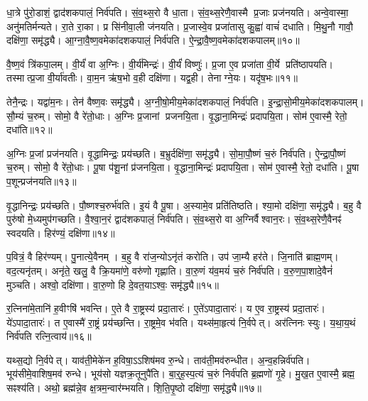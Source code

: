 धा॒त्रे पु॑रो॒डाशं॒ द्वाद॑शकपालं॒ निर्व॑पति।
सं॒व॒थ्स॒रो वै धा॒ता।
सं॒व॒थ्स॒रेणै॒वास्मै प्र॒जाः प्रज॑नयति।
अन्वे॒वास्मा॒ अनु॑मतिर्मन्यते।
रा॒ते रा॒का।
प्र सि॑नीवा॒ली ज॑नयति।
प्र॒जास्वे॒व प्रजा॑तासु कु॒ह्वा॑ वाचं॑ दधाति।
मि॒थु॒नौ गावौ॒ दक्षि॑णा॒ समृ॑द्ध्यै।
आ॒ग्ना॒वै॒ष्ण॒वमेका॑दशकपालं॒ निर्व॑पति।
ऐ॒न्द्रा॒वै॒ष्ण॒वमेका॑दशकपालम्॥१०॥

वै॒ष्ण॒वं त्रि॑कपा॒लम्।
वी॒र्यं॑ वा अ॒ग्निः।
वी॒र्य॑मिन्द्रः॑।
वी॒र्यं॑ विष्णुः॑।
प्र॒जा ए॒व प्रजा॑ता वी॒र्ये प्रति॑ष्ठापयति।
तस्मात्प्र॒जा वी॒र्या॑वतीः।
वा॒म॒न ऋ॑ष॒भो व॒ही दक्षि॑णा।
यद्व॒ही।
तेनाग्ने॒यः।
यदृ॑ष॒भः॥११॥

तेनै॒न्द्रः।
यद्वा॑म॒नः।
तेन॑ वैष्ण॒वः समृ॑द्ध्यै।
अ॒ग्नी॒षो॒मीय॒मेका॑\-दशकपालं॒ निर्व॑पति।
इ॒न्द्रा॒सो॒मीय॒मेका॑दशकपालम्।
सौ॒म्यं च॒रुम्।
सोमो॒ वै रे॑तो॒धाः।
अ॒ग्निः प्र॒जानां प्रजनयि॒ता।
वृ॒द्धाना॒मिन्द्रः॑ प्रदापयि॒ता।
सोम॑ ए॒वास्मै॒ रेतो॒ दधा॑ति॥१२॥

अ॒ग्निः प्र॒जां प्रज॑नयति।
वृ॒द्धामिन्द्रः॒ प्रय॑च्छति।
ब॒भ्रुर्दक्षि॑णा॒ समृ॑द्ध्यै।
सो॒मा॒पौ॒ष्णं च॒रुं निर्व॑पति।
ऐ॒न्द्रा॒पौ॒ष्णं च॒रुम्।
सोमो॒ वै रे॑तो॒धाः।
पू॒षा प॑शू॒नां प्र॑जनयि॒ता।
वृ॒द्धाना॒मिन्द्रः॑ प्रदापयि॒ता।
सोम॑ ए॒वास्मै॒ रेतो॒ दधा॑ति।
पू॒षा प॒शून्प्रज॑नयति॥१३॥

वृ॒द्धानिन्द्रः॒ प्रय॑च्छति।
पौ॒ष्णश्च॒रुर्भ॑वति।
इ॒यं वै पू॒षा।
अ॒स्यामे॒व प्रति॑तिष्ठति।
श्या॒मो दक्षि॑णा॒ समृ॑द्ध्यै।
ब॒हु वै पुरु॑षो मे॒ध्यमुप॑गच्छति।
वै॒श्वा॒न॒रं द्वाद॑शकपालं॒ निर्व॑पति।
सं॒व॒थ्स॒रो वा अ॒ग्निर्वैश्वान॒रः।
सं॒व॒थ्स॒रेणै॒वैनꣴ॑ स्वदयति।
हिर॑ण्यं॒ दक्षि॑णा॥१४॥

प॒वित्रं॒ वै हिर॑ण्यम्।
पु॒नात्ये॒वैनम्।
ब॒हु वै रा॑ज॒न्यो\-ऽनृ॑तं करोति।
उप॑ जा॒म्यै हर॑ते।
जि॒नाति॑ ब्राह्म॒णम्।
वद॒त्यनृ॑तम्।
अनृ॑ते॒ खलु॒ वै क्रि॒यमा॑णे॒ वरु॑णो गृह्णाति।
वा॒रु॒णं य॑व॒मयं॑ च॒रुं निर्व॑पति।
व॒रु॒ण॒पा॒शादे॒वैनं॑ मुञ्चति।
अश्वो॒ दक्षि॑णा।
वा॒रु॒णो हि दे॒वत॒या\-ऽश्वः॒ समृ॑द्ध्यै॥१५॥

र॒त्निना॑मे॒तानि॑ ह॒वीꣳषि॑ भवन्ति।
ए॒ते वै रा॒ष्ट्रस्य॑ प्रदा॒तारः॑।
ए॒ते॑\-ऽपादा॒तारः॑।
य ए॒व रा॒ष्ट्रस्य॑ प्रदा॒तारः॑।
ये॑ऽपादा॒तारः॑।
त ए॒वास्मै॑ रा॒ष्ट्रं प्रय॑च्छन्ति।
रा॒ष्ट्रमे॒व भ॑वति।
यथ्स॑मा॒हृत्य॑ नि॒र्वपेत्।
अर॑त्निनः स्युः।
य॒था॒य॒थं निर्व॑पति रत्नि॒त्वाय॑॥१६॥

यथ्स॒द्यो नि॒र्वपेत्।
याव॑ती॒मेके॑न ह॒विषा॒\-ऽऽशिष॑मव रु॒न्धे।
ताव॑ती॒मव॑रुन्धीत।
अ॒न्व॒हन्निर्व॑पति।
भूय॑सीमे॒वाशिष॒मव॑ रुन्धे।
भूय॑सो यज्ञक्र॒तूनुपै॑ति।
बा॒र्॒ह॒स्प॒त्यं च॒रुं निर्व॑पति ब्र॒ह्मणो॑ गृ॒हे।
मु॒ख॒त ए॒वास्मै॒ ब्रह्म॒ सꣴश्य॑ति।
अथो॒ ब्रह्म॑न्ने॒व क्ष॒त्रम॒न्वार॑म्भयति।
शि॒ति॒पृ॒ष्ठो दक्षि॑णा॒ समृ॑द्ध्यै॥१७॥


